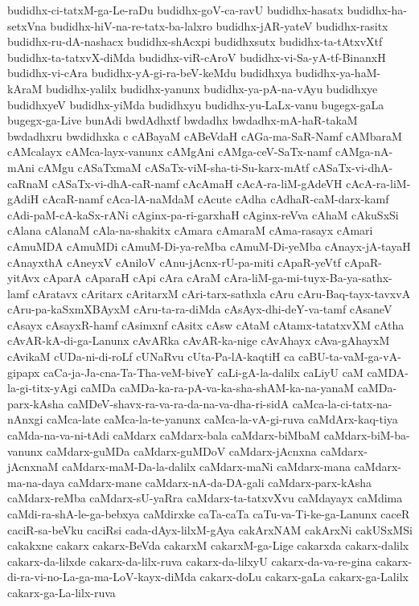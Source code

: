 {budidhx-ci-tatxM-ga-Le-raDu
budidhx-goV-ca-ravU
budidhx-hasatx
budidhx-ha-setxVna
budidhx-hiV-na-re-tatx-ba-lalxro
budidhx-jAR-yateV
budidhx-rasitx
budidhx-ru-dA-nashacx
budidhx-shAcxpi
budidhxsutx
budidhx-ta-tAtxvXtf
budidhx-ta-tatxvX-diMda
budidhx-viR-cAroV
budidhx-vi-Sa-yA-tf-BinanxH
budidhx-vi-cAra
budidhx-yA-gi-ra-beV-keMdu
budidhxya
budidhx-ya-haM-kAraM
budidhx-yalilx
budidhx-yanunx
budidhx-ya-pA-na-vAyu
budidhxye
budidhxyeV
budidhx-yiMda
budidhxyu
budidhx-yu-LaLx-vanu
bugegx-gaLa
bugegx-ga-Live
bunAdi
bwdAdhxtf
bwdadhx
bwdadhx-mA-haR-takaM
bwdadhxru
bwdidhxka
c
cABayaM
cABeVdaH
cAGa-ma-SaR-Namf
cAMbaraM
cAMcalayx
cAMca-layx-vanunx
cAMgAni
cAMga-ceV-SaTx-namf
cAMga-nA-mAni
cAMgu
cASaTxmaM
cASaTx-viM-sha-ti-Su-karx-mAtf
cASaTx-vi-dhA-caRnaM
cASaTx-vi-dhA-caR-namf
cAcAmaH
cAcA-ra-liM-gAdeVH
cAcA-ra-liM-gAdiH
cAcaR-namf
cAca-lA-naMdaM
cAcute
cAdha
cAdhaR-caM-darx-kamf
cAdi-paM-cA-kaSx-rANi
cAginx-pa-ri-garxhaH
cAginx-reVva
cAhaM
cAkuSxSi
cAlana
cAlanaM
cAla-na-shakitx
cAmara
cAmaraM
cAma-rasayx
cAmari
cAmuMDA
cAmuMDi
cAmuM-Di-ya-reMba
cAmuM-Di-yeMba
cAnayx-jA-tayaH
cAnayxthA
cAneyxV
cAniloV
cAnu-jAcnx-rU-pa-miti
cApaR-yeVtf
cApaR-yitAvx
cAparA
cAparaH
cApi
cAra
cAraM
cAra-liM-ga-mi-tuyx-Ba-ya-sathx-lamf
cAratavx
cAritarx
cAritarxM
cAri-tarx-sathxla
cAru
cAru-Baq-tayx-tavxvA
cAru-pa-kaSxmXBAyxM
cAru-ta-ra-diMda
cAsAyx-dhi-deY-va-tamf
cAsaneV
cAsayx
cAsayxR-hamf
cAsimxnf
cAsitx
cAsw
cAtaM
cAtamx-tatatxvXM
cAtha
cAvAR-kA-di-ga-Lanunx
cAvARka
cAvAR-ka-nige
cAvAhayx
cAva-gAhayxM
cAvikaM
cUDa-ni-di-roLf
cUNaRvu
cUta-Pa-lA-kaqtiH
ca
caBU-ta-vaM-ga-vA-gipapx
caCa-ja-Ja-cna-Ta-Tha-veM-biveY
caLi-gA-la-dalilx
caLiyU
caM
caMDA-la-gi-titx-yAgi
caMDa
caMDa-ka-ra-pA-va-ka-sha-shAM-ka-na-yanaM
caMDa-parx-kAsha
caMDeV-shavx-ra-va-ra-da-na-va-dha-ri-sidA
caMca-la-ci-tatx-na-nAnxgi
caMca-late
caMca-la-te-yanunx
caMca-la-vA-gi-ruva
caMdArx-kaq-tiya
caMda-na-va-ni-tAdi
caMdarx
caMdarx-bala
caMdarx-biMbaM
caMdarx-biM-ba-vanunx
caMdarx-guMDa
caMdarx-guMDoV
caMdarx-jAcnxna
caMdarx-jAcnxnaM
caMdarx-maM-Da-la-dalilx
caMdarx-maNi
caMdarx-mana
caMdarx-ma-na-daya
caMdarx-mane
caMdarx-nA-da-DA-gali
caMdarx-parx-kAsha
caMdarx-reMba
caMdarx-sU-yaRra
caMdarx-ta-tatxvXvu
caMdayayx
caMdima
caMdi-ra-shA-le-ga-bebxya
caMdirxke
caTa-caTa
caTu-va-Ti-ke-ga-Lanunx
caceR
caciR-sa-beVku
caciRsi
cada-dAyx-lilxM-gAya
cakArxNAM
cakArxNi
cakUSxMSi
cakakxne
cakarx
cakarx-BeVda
cakarxM
cakarxM-ga-Lige
cakarxda
cakarx-dalilx
cakarx-da-lilxde
cakarx-da-lilx-ruva
cakarx-da-lilxyU
cakarx-da-va-re-gina
cakarx-di-ra-vi-no-La-ga-ma-LoV-kayx-diMda
cakarx-doLu
cakarx-gaLa
cakarx-ga-Lalilx
cakarx-ga-La-lilx-ruva
}
